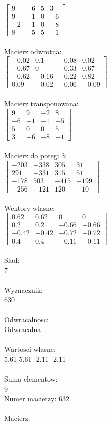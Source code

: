 \documentclass[a4paper,12pt]{article}
\begin{document}
$\begin{bmatrix} 9&-6&5&3\\9&-1&0&-6\\-2&-1&0&-8\\8&-5&5&-1 \end{bmatrix}$
\\
\\
Macierz odwrotna:\\

$\begin{bmatrix} -0.02&0.1&-0.08&0.02\\-0.67&0&-0.33&0.67\\-0.62&-0.16&-0.22&0.82\\0.09&-0.02&-0.06&-0.09 \end{bmatrix}$
\\
\\
Macierz transponowana:\\

$\begin{bmatrix} 9&9&-2&8\\-6&-1&-1&-5\\5&0&0&5\\3&-6&-8&-1 \end{bmatrix}$
\\
\\
Macierz do potegi 3:\\

$\begin{bmatrix} -203&-338&305&31\\291&-331&315&51\\-178&503&-415&-199\\-256&-121&120&-10 \end{bmatrix}$
\\
\\
Wektory wlasne:\\

$\begin{bmatrix} 0.62&0.62&0&0\\0.2&0.2&-0.66&-0.66\\-0.42&-0.42&-0.72&-0.72\\0.4&0.4&-0.11&-0.11 \end{bmatrix}$
\\
\\
Slad:\\
7
\\
\\
Wyznacznik:\\
630
\\
\\
Odwracalnosc:\\
Odwracalna
\\
\\
Wartosci wlasne:\\
5.61 5.61 -2.11 -2.11
\\
\\
Suma elementow:\\
9
\\
\newpage
Numer macierzy:
632
\\
\\
Macierz:\\
\end{document}
